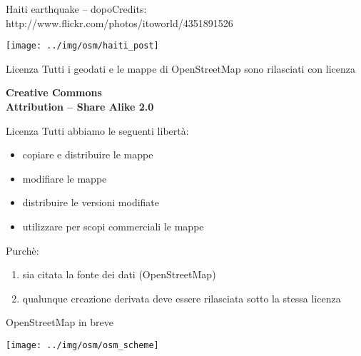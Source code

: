 \documentclass[xcolor=svgnames]{beamer}
\begin{document}

	\begin{frame}{Haiti earthquake -- dopo}{Credits: http://www.flickr.com/photos/itoworld/4351891526}
		\begin{center}
			\texttt{[image: ../img/osm/haiti\_post]}
		\end{center}
	\end{frame}


	\begin{frame}{Licenza}
		Tutti i geodati e le mappe di OpenStreetMap sono rilasciati con licenza

		\begin{center}
			\fontsize{50}{60}\selectfont \ccbysa
		\end{center}
		\begin{center}
			\textbf{Creative Commons}\\
			\textbf{Attribution -- Share Alike 2.0}
		\end{center}
	\end{frame}


	\begin{frame}{Licenza}
		Tutti abbiamo le seguenti libertà:
		\begin{itemize}
			\item copiare e distribuire le mappe
			\item modifiare le mappe
			\item distribuire le versioni modifiate
			\item utilizzare per scopi commerciali le mappe
		\end{itemize}

		Purchè:
		\begin{enumerate}
			\item sia citata la fonte dei dati (OpenStreetMap)
			\item qualunque creazione derivata deve essere rilasciata sotto la stessa licenza
		\end{enumerate}
	\end{frame}


	\begin{frame}{OpenStreetMap in breve}
		\begin{center}
			\texttt{[image: ../img/osm/osm\_scheme]}
		\end{center}
	\end{frame}
\end{document}
